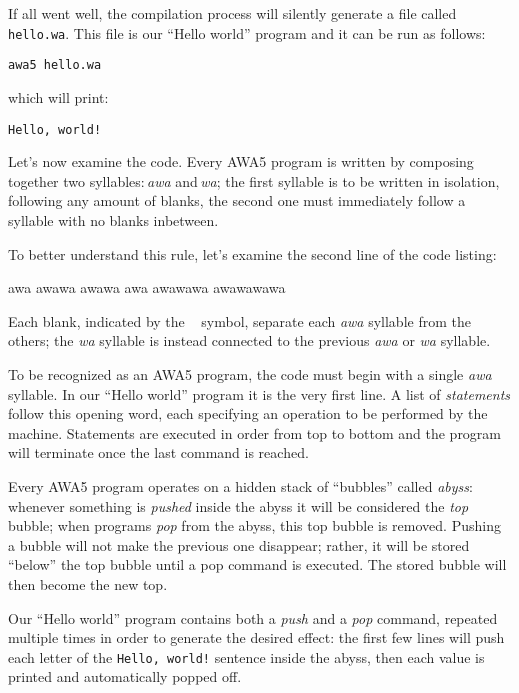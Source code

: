 \documentclass[11pt,a4paper,draft]{book}
\begin{document}
If all went well, the compilation process will silently generate a
file called \verb|hello.wa|. This file is our \enquote{Hello world}
program and it can be run as follows:
\begin{verbatim}
awa5 hello.wa
\end{verbatim}

which will print:
\begin{verbatim}
Hello, world!
\end{verbatim}

\label{awa-bits}
Let's now examine the code. Every AWA5 program is written by composing
together two syllables:\,\emph{awa} and\,\emph{wa}; the first syllable
is to be written in isolation, following any amount of blanks, the
second one must immediately follow a syllable with no blanks
inbetween.

To better understand this rule, let's examine the second line of the
code listing:
\begin{verbatim*}
awa awawa awawa awa awawawa awawawawa
\end{verbatim*}

Each blank, indicated by the \verb*| | symbol,
separate each \emph{awa} syllable from the others;
the \emph{wa} syllable is instead connected to the
previous \emph{awa} or \emph{wa} syllable.

To be recognized as an AWA5 program, the code must begin with a single
\emph{awa} syllable. In our \enquote{Hello world} program it is the
very first line. A list of \emph{statements} follow this opening word,
each specifying an operation to be performed by the
machine. Statements are executed in order from top to bottom and the
program will terminate once the last command is reached.

Every AWA5 program operates on a hidden stack of \enquote{bubbles}
called \emph{abyss}: whenever something is \emph{pushed} inside the
abyss it will be considered the \emph{top} bubble; when programs
\emph{pop} from the abyss, this top bubble is removed. Pushing a
bubble will not make the previous one disappear; rather, it will be
stored \enquote{below} the top bubble until a pop command is
executed. The stored bubble will then become the new top.

Our \enquote{Hello world} program contains both a \emph{push} and a
\emph{pop} command, repeated multiple times in order to generate the
desired effect: the first few lines will push each letter of the
\verb|Hello, world!| sentence inside the abyss, then each value is
printed and automatically popped off.
\end{document}
